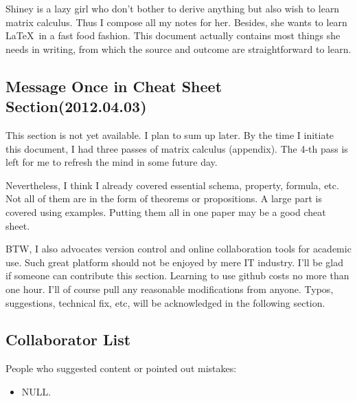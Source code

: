 Shiney is a lazy girl who don't bother to derive
anything but also wish to learn matrix calculus. 
Thus I compose all my notes for her. Besides, she 
wants to learn \LaTeX ~in a fast food fashion. This 
document actually contains most things she needs 
in writing, from which the source and outcome are 
straightforward to learn. 


\subsection*{Message Once in Cheat Sheet Section(2012.04.03)}

This section is not yet available. I plan to sum up later. By the time 
I initiate this document, I had three passes of matrix calculus
(appendix). The 4-th 
pass is left for me to refresh the mind in some future day. 

Nevertheless, I think I already covered essential schema, property, 
formula, etc. Not all of them are in the form of theorems or propositions. 
A large part is covered using examples. Putting them all in one paper 
may be a good cheat sheet. 

BTW, I also advocates version control and online 
collaboration tools for academic use. Such great platform 
should not be enjoyed by mere IT industry. I'll 
be glad if someone can contribute this section. Learning 
to use github costs no more than one hour. I'll of course 
pull any reasonable modifications from anyone. 
Typos, suggestions, technical fix, etc, will be acknowledged 
in the following section. 

\subsection*{Collaborator List}

People who suggested content or pointed out mistakes:
\begin{itemize}
	\item NULL. 
\end{itemize}


